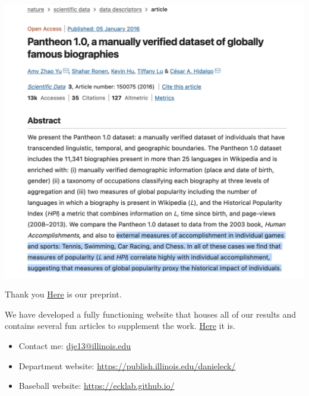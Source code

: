 \documentclass[
  ignorenonframetext,
]{beamer}
\providecommand{\tightlist}{%
  \setlength{\itemsep}{0pt}\setlength{\parskip}{0pt}}
\begin{document}
\begin{frame}{}
\protect\hypertarget{section-18}{}
\includegraphics{Pantheon.png}
\end{frame}

\begin{frame}{Thank you}
\protect\hypertarget{thank-you}{}
\href{https://arxiv.org/abs/2207.11332}{Here} is our preprint.

\vspace{12pt}

We have developed a fully functioning website that houses all of our
results and contains several fun articles to supplement the work.
\href{https://eckeraadjustment.web.illinois.edu/\#rankings}{Here} it is.

\vspace{12pt}

\begin{itemize}
\tightlist
\item
  Contact me: \url{dje13@illinois.edu}
\item
  Department website: \url{https://publish.illinois.edu/danieleck/}
\item
  Baseball website: \url{https://ecklab.github.io/}
\end{itemize}
\end{frame}
\end{document}
